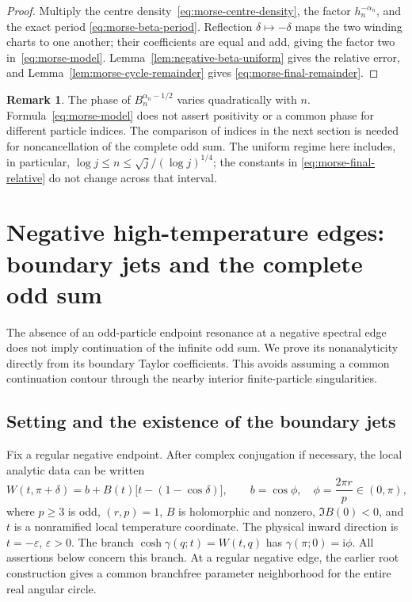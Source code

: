 \documentclass[11pt]{article}
\numberwithin{equation}{section}
\theoremstyle{definition}
\newtheorem{remark}[theorem]{Remark}
\newcommand{\ii}{\mathrm i}
\newcommand{\eps}{\varepsilon}
\begin{document}
\begin{proof}
Multiply the centre density~\eqref{eq:morse-centre-density}, the
factor $h_n^{-\alpha_n}$, and the exact period
\eqref{eq:morse-beta-period}.  Reflection $\delta\mapsto-\delta$
maps the two winding charts to one another; their coefficients are
equal and add, giving the factor two in~\eqref{eq:morse-model}.
Lemma~\ref{lem:negative-beta-uniform} gives the relative error, and
Lemma~\ref{lem:morse-cycle-remainder} gives
\eqref{eq:morse-final-remainder}.
\end{proof}

\begin{remark}
The phase of $B_n^{\alpha_n-1/2}$ varies quadratically with $n$.
Formula~\eqref{eq:morse-model} does not assert positivity or a common
phase for different particle indices.  The comparison of indices in
the next section is needed for noncancellation of the complete odd
sum.  The uniform regime here includes, in particular,
$\log j\le n\le\sqrt j/(\log j)^{1/4}$; the constants in
\eqref{eq:morse-final-relative} do not change across that interval.
\end{remark}



\section{Negative high-temperature edges: boundary jets and the complete odd sum}
\label{sec:jets}

The absence of an odd-particle endpoint resonance at a negative spectral
edge does not imply continuation of the infinite odd sum. We prove its
nonanalyticity directly from its boundary Taylor coefficients. This avoids
assuming a common continuation contour through the nearby interior
finite-particle singularities.

\subsection{Setting and the existence of the boundary jets}

Fix a regular negative endpoint. After complex conjugation if necessary,
the local analytic data can be written
\begin{equation}\label{eq:jets_setting}
 W(t,\pi+\delta)=b+B(t)\bigl[t-(1-\cos\delta)\bigr],\qquad
 b=\cos\phi,\quad \phi=\frac{2\pi r}{p}\in(0,\pi),
\end{equation}
where $p\ge3$ is odd, $(r,p)=1$, $B$ is holomorphic and nonzero,
$\Im B(0)<0$, and $t$ is a nonramified local temperature coordinate.
The physical inward direction is $t=-\eps$, $\eps>0$. The branch
$\cosh\gamma(q;t)=W(t,q)$ has
$\gamma(\pi;0)=\ii\phi$. All assertions below concern this branch.
At a regular negative edge, the earlier root construction gives a common
branchfree parameter neighborhood for the entire real angular circle.
\end{document}
